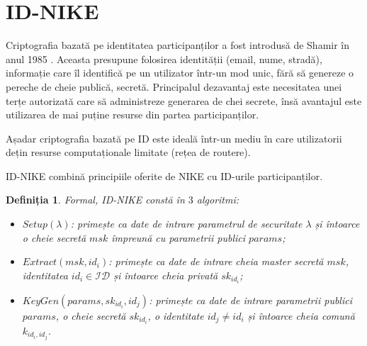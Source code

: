 \documentclass[oneside, 12pt]{book}
\newtheorem{definitie}{\textbf{Definiția}}[section]
\begin{document}
\section{ID-NIKE}
\label{sec:id-nike}

Criptografia bazată pe identitatea participanților a fost introdusă de Shamir în anul 1985 \cite{shamir:1985identity}. Aceasta presupune folosirea identității (email, nume, stradă), informație care îl identifică pe un utilizator într-un mod unic, fără să genereze o pereche de cheie publică, secretă. Principalul dezavantaj este necesitatea unei terțe autorizată care să administreze generarea de chei secrete, însă avantajul este utilizarea de mai puține resurse din partea participanților.

Așadar criptografia bazată pe ID este ideală într-un mediu în care utilizatorii dețin resurse computaționale limitate (rețea de routere).

ID-NIKE combină principiile oferite de NIKE cu ID-urile participanților.

\begin{definitie}
 	Formal, ID-NIKE constă în $3$ algoritmi:
	\begin{itemize}
		\item $Setup(\lambda)$: primește ca date de intrare parametrul de securitate $\lambda$ și întoarce o cheie secretă $msk$ împreună cu parametrii publici $params$;
		\item $Extract(msk, id_i)$: primește ca date de intrare cheia master secretă $msk$, identitatea $id_i \in \mathcal{ID}$ și întoarce cheia privată $sk_{id_i}$;
		\item $KeyGen(params, sk_{id_i}, id_j)$: primește ca date de intrare parametrii publici $params$, o cheie secretă $sk_{id_i}$, o identitate $id_j \neq id_i$ și întoarce cheia comună $k_{id_i, id_j}$.
	\end{itemize}
\end{definitie}

\end{document}
